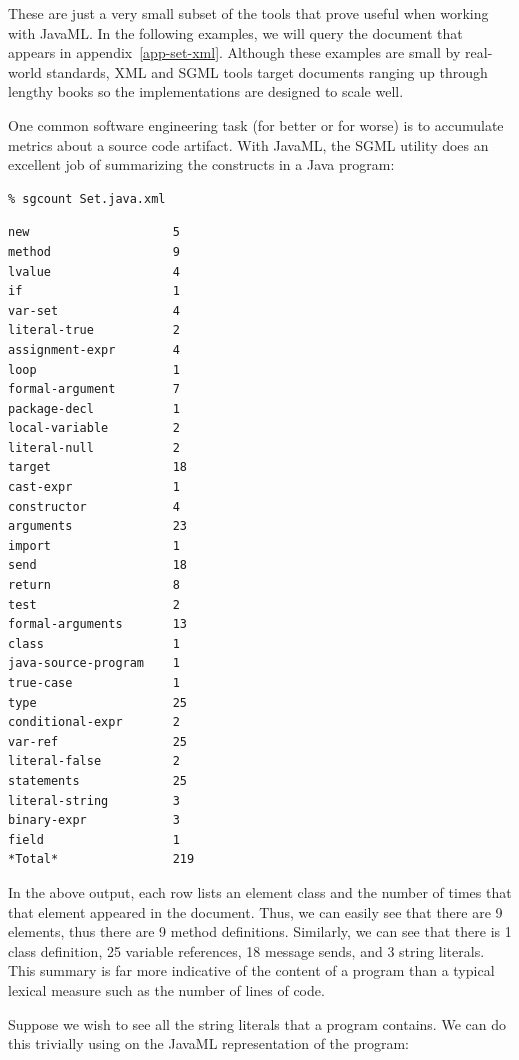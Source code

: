 \documentclass{article}
\begin{document}
These are just a very small subset of the tools that prove useful when
working with JavaML.  In the following examples, we will query the
 document that appears in
appendix~\ref{app-set-xml}.  Although these examples are small by
real-world standards, XML and SGML tools target documents ranging up
through lengthy books so the implementations are designed to scale well.

One common software engineering task (for better or for worse) is to
accumulate metrics about a source code artifact.  With JavaML, the SGML
utility  does an excellent job of summarizing the
constructs in a Java program:

{\bfseries
\begin{verbatim}
% sgcount Set.java.xml
\end{verbatim}
}
{\small
\begin{verbatim}
new                    5  
method                 9  
lvalue                 4  
if                     1  
var-set                4  
literal-true           2  
assignment-expr        4  
loop                   1  
formal-argument        7  
package-decl           1  
local-variable         2  
literal-null           2  
target                 18 
cast-expr              1  
constructor            4  
arguments              23 
import                 1  
send                   18 
return                 8  
test                   2  
formal-arguments       13 
class                  1  
java-source-program    1  
true-case              1  
type                   25 
conditional-expr       2  
var-ref                25 
literal-false          2  
statements             25 
literal-string         3  
binary-expr            3  
field                  1  
*Total*                219 
\end{verbatim}
}

In the above output, each row lists an element class and the number of
times that that element appeared in the document.  Thus, we can easily
see that there are 9  elements, thus there are 9
method definitions.  Similarly, we can see that there is 1 class
definition, 25 variable references, 18 message sends, and 3 string
literals.  This summary is far more indicative of the content of a
program than a typical lexical measure such as the number of lines of
code.

Suppose we wish to see all the string literals that a program contains.
We can do this trivially using  on the JavaML
representation of the program:
\end{document}
